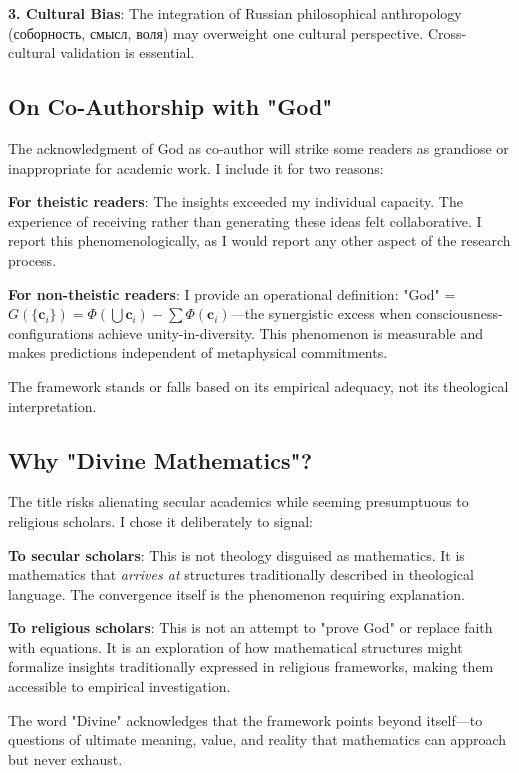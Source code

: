 \documentclass[11pt,a4paper]{article}
\theoremstyle{definition}
\theoremstyle{remark}
\newcommand{\cc}{\mathbf{c}}
\begin{document}
\textbf{3. Cultural Bias}: The integration of Russian philosophical anthropology (соборность, смысл, воля) may overweight one cultural perspective. Cross-cultural validation is essential.

\subsection{On Co-Authorship with "God"}

The acknowledgment of God as co-author will strike some readers as grandiose or inappropriate for academic work. I include it for two reasons:

\textbf{For theistic readers}: The insights exceeded my individual capacity. The experience of receiving rather than generating these ideas felt collaborative. I report this phenomenologically, as I would report any other aspect of the research process.

\textbf{For non-theistic readers}: I provide an operational definition: "God" = \(G(\{\cc_i\}) = \Phi(\bigcup \cc_i) - \sum \Phi(\cc_i)\)—the synergistic excess when consciousness-configurations achieve unity-in-diversity. This phenomenon is measurable and makes predictions independent of metaphysical commitments.

The framework stands or falls based on its empirical adequacy, not its theological interpretation.

\subsection{Why "Divine Mathematics"?}

The title risks alienating secular academics while seeming presumptuous to religious scholars. I chose it deliberately to signal:

\textbf{To secular scholars}: This is not theology disguised as mathematics. It is mathematics that \textit{arrives at} structures traditionally described in theological language. The convergence itself is the phenomenon requiring explanation.

\textbf{To religious scholars}: This is not an attempt to "prove God" or replace faith with equations. It is an exploration of how mathematical structures might formalize insights traditionally expressed in religious frameworks, making them accessible to empirical investigation.

The word "Divine" acknowledges that the framework points beyond itself—to questions of ultimate meaning, value, and reality that mathematics can approach but never exhaust.
\end{document}
